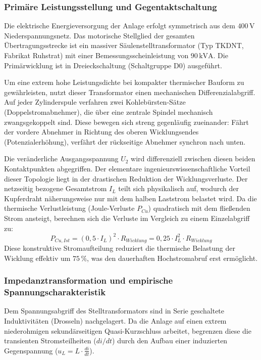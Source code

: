 \subsubsection{Primäre Leistungsstellung und Gegentaktschaltung}
\label{sec:ist_gegentakt}
Die elektrische Energieversorgung der Anlage erfolgt symmetrisch aus dem $400\,\text{V}$ Niederspannungsnetz. Das motorische Stellglied der gesamten Übertragungsstrecke ist ein massiver Säulenstelltransformator (Typ TKDNT, Fabrikat Ruhstrat) mit einer Bemessungsscheinleistung von $90\,\text{kVA}$. Die Primärwicklung ist in Dreieckschaltung (Schaltgruppe D0) ausgeführt.

Um eine extrem hohe Leistungsdichte bei kompakter thermischer Bauform zu gewährleisten, nutzt dieser Transformator einen mechanischen Differenzialabgriff. Auf jeder Zylinderspule verfahren zwei Kohlebürsten-Sätze (Doppelstromabnehmer), die über eine zentrale Spindel mechanisch zwangsgekoppelt sind. Diese bewegen sich streng gegenläufig zueinander: Fährt der vordere Abnehmer in Richtung des oberen Wicklungsendes (Potenzialerhöhung), verfährt der rückseitige Abnehmer synchron nach unten. 

Die veränderliche Ausgangsspannung $U_2$ wird differenziell zwischen diesen beiden Kontaktpunkten abgegriffen. Der elementare ingenieurswissenschaftliche Vorteil dieser Topologie liegt in der drastischen Reduktion der Wicklungsverluste. Der netzseitig bezogene Gesamtstrom $I_L$ teilt sich physikalisch auf, wodurch der Kupferdraht näherungsweise nur mit dem halben Laststrom belastet wird. Da die thermische Verlustleistung (Joule-Verluste $P_{Cu}$) quadratisch mit dem fließenden Strom ansteigt, berechnen sich die Verluste im Vergleich zu einem Einzelabgriff zu:
\begin{equation}
    P_{Cu,Ist} = (0,5 \cdot I_L)^2 \cdot R_{Wicklung} = 0,25 \cdot I_L^2 \cdot R_{Wicklung}
\end{equation}
Diese konstruktive Stromaufteilung reduziert die thermische Belastung der Wicklung effektiv um $75\,\%$, was den dauerhaften Hochstromabruf erst ermöglicht.
\subsubsection{Impedanztransformation und empirische Spannungscharakteristik}
\label{sec:ist_impedanz}
Dem Spannungsabgriff des Stelltransformators sind in Serie geschaltete Induktivitäten (Drosseln) nachgelagert. Da die Anlage auf einen extrem niederohmigen sekundärseitigen Quasi-Kurzschluss arbeitet, begrenzen diese die transienten Stromsteilheiten ($di/dt$) durch den Aufbau einer induzierten Gegenspannung ($u_L = L \cdot \frac{di}{dt}$).

